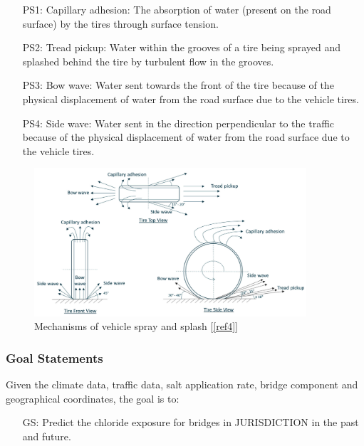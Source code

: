 \documentclass[12pt]{article}
\newcounter{goalnum} %
\newcommand{\reref}[1]{\ref{#1}}
\begin{document}
\begin{itemize}

\item[PS1:] Capillary adhesion: The absorption of water (present on the road surface) by the tires through surface tension.

\item[PS2:] Tread pickup: Water within the grooves of a tire being sprayed and splashed behind the tire by turbulent flow in the grooves.

\item[PS3:] Bow wave: Water sent towards the front of the tire because of the physical displacement of water from the road surface due to the vehicle tires.

\item[PS4:] Side wave: Water sent in the direction perpendicular to the traffic because of the physical displacement of water from the road surface due to the vehicle tires.

\end{itemize}


\begin{figure}[h!]
\begin{center}
\includegraphics[width=0.9\textwidth]{phymodel}
\caption{\label{4mechanism} Mechanisms of vehicle spray and splash [\reref{ref4}]}

\end{center}
\end{figure}

\newpage
\subsubsection{Goal Statements}

\noindent Given the climate data, traffic data, salt application rate, bridge component and geographical coordinates, the goal is to:

\begin{itemize}

\item[GS\refstepcounter{goalnum}\thegoalnum \label{G_ChlorideExposurePrediction}:] Predict the chloride exposure for bridges in JURISDICTION in the past and future.
\end{itemize}
\end{document}
